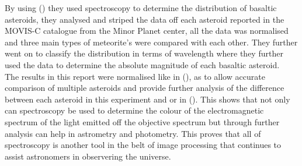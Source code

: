 \documentclass[12pt]{article}
\begin{document}
By using (\cite{Asteroids}) they used spectroscopy to determine the distribution of basaltic asteroids, they analysed and striped the data off each asteroid reported in the MOVIS-C catalogue from the Minor Planet center, all the data was normalised and three main types of meteorite's were compared with each other. They further went on to classify the distribution in terms of wavelength where they further used the data to determine the absolute magnitude of each basaltic asteroid. \\

The results in this report were normalised like in (\cite{Asteroids}), as to allow accurate comparison of multiple asteroids and provide further analysis of the difference between each asteroid in this experiment and or in (\cite{Asteroids}). This shows that not only can spectroscopy be used to determine the colour of the electromagnetic spectrum of the light emitted off the objective spectrum but through further analysis can help in astrometry and photometry. This proves that all of spectroscopy is another tool in the belt of image processing that continues to assist astronomers in observering the universe.

\printbibliography
\end{document}
